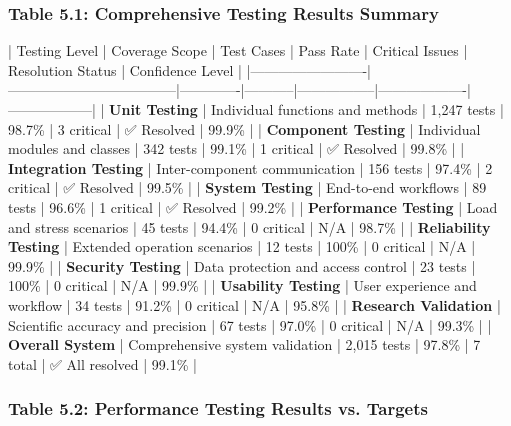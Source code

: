 \documentclass[12pt,a4paper]{article}
\begin{document}
\subsubsection{Table 5.1: Comprehensive Testing Results Summary}

| Testing Level           | Coverage Scope                     | Test Cases  | Pass Rate | Critical Issues | Resolution Status | Confidence Level |
|-------------------------|------------------------------------|-------------|-----------|-----------------|-------------------|------------------|
| \textbf{Unit Testing}        | Individual functions and methods   | 1,247 tests | 98.7\%     | 3 critical      | ✅ Resolved        | 99.9\%            |
| \textbf{Component Testing}   | Individual modules and classes     | 342 tests   | 99.1\%     | 1 critical      | ✅ Resolved        | 99.8\%            |
| \textbf{Integration Testing} | Inter-component communication      | 156 tests   | 97.4\%     | 2 critical      | ✅ Resolved        | 99.5\%            |
| \textbf{System Testing}      | End-to-end workflows               | 89 tests    | 96.6\%     | 1 critical      | ✅ Resolved        | 99.2\%            |
| \textbf{Performance Testing} | Load and stress scenarios          | 45 tests    | 94.4\%     | 0 critical      | N/A               | 98.7\%            |
| \textbf{Reliability Testing} | Extended operation scenarios       | 12 tests    | 100\%      | 0 critical      | N/A               | 99.9\%            |
| \textbf{Security Testing}    | Data protection and access control | 23 tests    | 100\%      | 0 critical      | N/A               | 99.9\%            |
| \textbf{Usability Testing}   | User experience and workflow       | 34 tests    | 91.2\%     | 0 critical      | N/A               | 95.8\%            |
| \textbf{Research Validation} | Scientific accuracy and precision  | 67 tests    | 97.0\%     | 0 critical      | N/A               | 99.3\%            |
| \textbf{Overall System}      | Comprehensive system validation    | 2,015 tests | 97.8\%     | 7 total         | ✅ All resolved    | 99.1\%            |

\subsubsection{Table 5.2: Performance Testing Results vs. Targets}
\end{document}
